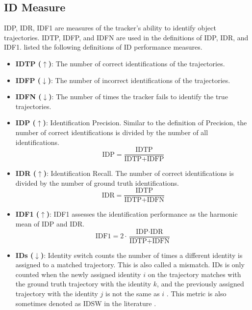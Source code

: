\begin{itemize}
\end{itemize}


\subsection{ID Measure}
IDP, IDR, IDF1 are measures of the tracker's ability to identify object trajectories. IDTP, IDFP, and IDFN are used in the definitions of IDP, IDR, and IDF1. \citeauthor{ristani_performance_2016} \cite{ristani_performance_2016} listed the following definitions of ID performance measures.

\begin{itemize}

\item \textbf{IDTP ($\uparrow$)}: The number of correct identifications of the trajectories.

\item \textbf{IDFP ($\downarrow$)}: The number of incorrect identifications of the trajectories.

\item \textbf{IDFN ($\downarrow$)}: The number of times the tracker fails to identify the true trajectories.

\item \textbf{IDP ($\uparrow$)}: Identification Precision. Similar to the definition of Precision, the number of correct identifications is divided by the number of all identifications.
\begin{equation}
\text{IDP} = \frac{\text{IDTP}}{\text{IDTP} + \text{IDFP}}
\label{eqn:IDP}
\end{equation}

\item \textbf{IDR ($\uparrow$)}: Identification Recall. The number of correct identifications is divided by the number of ground truth identifications.
\begin{equation}
\text{IDR} = \frac{\text{IDTP}}{\text{IDTP} + \text{IDFN}}
\label{eqn:IDR}
\end{equation}

\item \textbf{IDF1 ($\uparrow$)}: IDF1 assesses the identification performance as the harmonic mean of IDP and IDR. 
\begin{equation}
\text{IDF1} = 2 \cdot \frac{\text{IDP} \cdot \text{IDR}}{\text{IDTP} + \text{IDFN}}
\label{eqn:IDF1}
\end{equation}

\item \textbf{IDs ($\downarrow$)}: Identity switch counts the number of times a different identity is assigned to a matched trajectory. This is also called a mismatch. IDs is only counted when the newly assigned identity $\textit{i}$ on the trajectory matches with the ground truth trajectory with the identity $\textit{k}$, and the previously assigned trajectory with the identity $\textit{j}$ is not the same as $\textit{i}$ \cite{milan_mot16_2016}. This metric is also sometimes denoted as IDSW in the literature \cite{milan_mot16_2016}.
\end{itemize}



